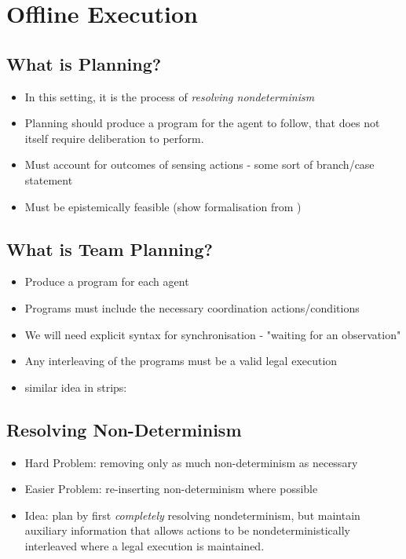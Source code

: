 \chapter{Offline Execution}\label{ch:offline-exec}

\section{What is Planning?}
\begin{itemize}
\item In this setting, it is the process of \emph{resolving nondeterminism}
\item Planning should produce a program for the agent to follow, that does
not itself require deliberation to perform. \cite{levesque96what_is_planning,giacomo04sem_delib_indigolog}
\item Must account for outcomes of sensing actions - some sort of branch/case statement
\item Must be epistemically feasible (show formalisation from \cite{giacomo04sem_delib_indigolog})
\end{itemize}

\section{What is Team Planning?}
\begin{itemize}
\item Produce a program for each agent
\item Programs must include the necessary coordination actions/conditions
\item We will need explicit syntax for synchronisation - "waiting for an observation"
\item Any interleaving of the programs must be a valid legal execution
\item similar idea in strips: \cite{boutilier01partialorder_conc}
\end{itemize}

\section{Resolving Non-Determinism}
\begin{itemize}
\item Hard Problem: removing only as much non-determinism as necessary
\item Easier Problem: re-inserting non-determinism where possible
\item Idea:  plan by first \emph{completely} resolving nondeterminism, but
maintain auxiliary information that allows actions to be nondeterministically 
interleaved where a legal execution is maintained.
\end{itemize}

